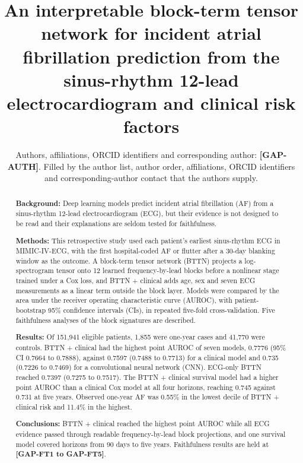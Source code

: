 \documentclass[preprint,12pt]{elsarticle}
\begin{document}
\begin{frontmatter}

\title{An interpretable block-term tensor network for incident atrial fibrillation prediction from the sinus-rhythm 12-lead electrocardiogram and clinical risk factors}

\author{Authors, affiliations, ORCID identifiers and corresponding author: \textbf{[GAP-AUTH]}. Filled by the author list, author order, affiliations, ORCID identifiers and corresponding-author contact that the authors supply.}

\begin{abstract}
\noindent \textbf{Background:} Deep learning models predict incident atrial fibrillation (AF) from a sinus-rhythm 12-lead electrocardiogram (ECG), but their evidence is not designed to be read and their explanations are seldom tested for faithfulness.

\noindent \textbf{Methods:} This retrospective study used each patient's earliest sinus-rhythm ECG in MIMIC-IV-ECG, with the first hospital-coded AF or flutter after a 30-day blanking window as the outcome. A block-term tensor network (BTTN) projects a log-spectrogram tensor onto 12 learned frequency-by-lead blocks before a nonlinear stage trained under a Cox loss, and BTTN + clinical adds age, sex and seven ECG measurements as a linear term outside the block layer. Models were compared by the area under the receiver operating characteristic curve (AUROC), with patient-bootstrap 95\% confidence intervals (CIs), in repeated five-fold cross-validation. Five faithfulness analyses of the block signatures are described.

\noindent \textbf{Results:} Of 151,941 eligible patients, 1,855 were one-year cases and 41,770 were controls. BTTN + clinical had the highest point AUROC of seven models, 0.7776 (95\% CI 0.7664 to 0.7888), against 0.7597 (0.7488 to 0.7713) for a clinical model and 0.735 (0.7226 to 0.7469) for a convolutional neural network (CNN). ECG-only BTTN reached 0.7397 (0.7275 to 0.7517). The BTTN + clinical survival model had a higher point AUROC than a clinical Cox model at all four horizons, reaching 0.745 against 0.731 at five years. Observed one-year AF was 0.55\% in the lowest decile of BTTN + clinical risk and 11.4\% in the highest.

\noindent \textbf{Conclusions:} BTTN + clinical reached the highest point AUROC while all ECG evidence passed through readable frequency-by-lead block projections, and one survival model covered horizons from 90 days to five years. Faithfulness results are held at \textbf{[GAP-FT1 to GAP-FT5]}.


\end{abstract}
\end{frontmatter}
\end{document}

